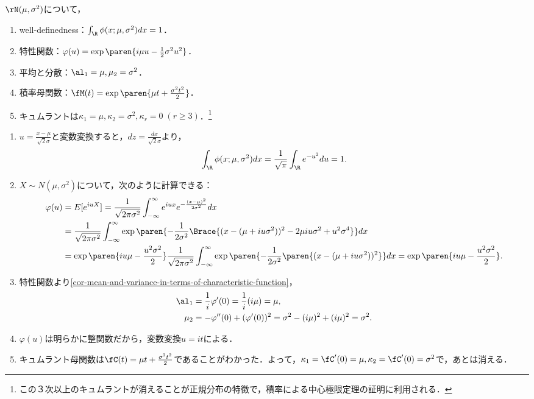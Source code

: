 \documentclass[uplatex,dvipdfmx]{jsreport}
\begin{document}
\begin{proposition}[分布の母関数]
    $\rN(\mu,\sigma^2)$について，
    \begin{enumerate}
        \item well-definedness：$\int_\R\phi(x;\mu,\sigma^2)dx=1$．
        \item 特性関数：$\varphi(u)=\exp\paren{i\mu u-\frac{1}{2}\sigma^2u^2}$．
        \item 平均と分散：$\al_1=\mu,\mu_2=\sigma^2$．
        \item 積率母関数：$\fM(t)=\exp\paren{\mu t+\frac{\sigma^2t^2}{2}}$．
        \item キュムラントは$\kappa_1=\mu,\kappa_2=\sigma^2,\kappa_r=0\;(r\ge 3)$．\footnote{この３次以上のキュムラントが消えることが正規分布の特徴で，積率による中心極限定理の証明に利用される．}
    \end{enumerate}
\end{proposition}
\begin{Proof}\mbox{}
    \begin{enumerate}
        \item $u=\frac{x-\mu}{\sqrt{2}\sigma}$と変数変換すると，$dz=\frac{dx}{\sqrt{2}\sigma}$より，
        \[\int_\R\phi(x;\mu,\sigma^2)dx=\frac{1}{\sqrt{\pi}}\int_\R e^{-u^2}du=1.\]
        \item $X\sim N(\mu,\sigma^2)$について，次のように計算できる：
        \begin{align*}
            \varphi(u)&=E[e^{iuX}]=\frac{1}{\sqrt{2\pi\sigma^2}}\int^\infty_{-\infty}e^{iux}e^{-\frac{(x-\mu)^2}{2\sigma^2}}dx\\
            &=\frac{1}{\sqrt{2\pi\sigma^2}}\int^\infty_{-\infty}\exp\paren{-\frac{1}{2\sigma^2}\Brace{(x-(\mu+iu\sigma^2))^2-2\mu iu\sigma^2+u^2\sigma^4}}dx\\
            &=\exp\paren{iu\mu-\frac{u^2\sigma^2}{2}}\frac{1}{\sqrt{2\pi\sigma^2}}\int^\infty_{-\infty}\exp\paren{-\frac{1}{2\sigma^2}\paren{(x-(\mu+iu\sigma^2))^2}}dx=\exp\paren{iu\mu-\frac{u^2\sigma^2}{2}}.
        \end{align*}
        \item 特性関数より\ref{cor-mean-and-variance-in-terms-of-characteristic-function}，
        \begin{align*}
            \al_1&=\frac{1}{i}\varphi'(0)=\frac{1}{i}(i\mu)=\mu,\\
            \mu_2&=-\varphi''(0)+(\varphi'(0))^2=\sigma^2-(i\mu)^2+(i\mu)^2=\sigma^2.
        \end{align*}
        \item $\varphi(u)$は明らかに整関数だから，変数変換$u=it$による．
        \item キュムラント母関数は$\fC(t)=\mu t+\frac{\sigma^2t^2}{2}$であることがわかった．よって，$\kappa_1=\fC'(0)=\mu,\kappa_2=\fC'(0)=\sigma^2$で，あとは消える．
    \end{enumerate}
\end{Proof}
\end{document}
